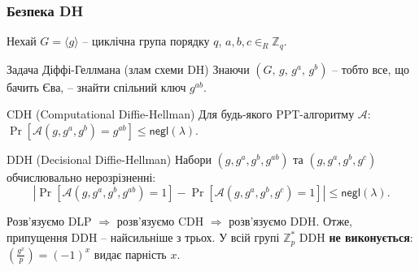 \documentclass{../zkdl-presentation-template}
\newcommand{\legendre}[2]{\left(\frac{#1}{#2}\right)}
\newcommand{\inR}{\in_R}
\begin{document}
\begin{frame}
    \frametitle{Безпека DH}
    \small
    Нехай $G=\langle g\rangle$ -- циклічна група порядку $q$, $a,b,c\inR\mathbb{Z}_q$.
    \begin{block}{Задача Діффі-Геллмана (злам схеми DH)}
        Знаючи $(G,\,g,\,g^{a},\,g^{b})$ -- тобто все, що бачить Єва, -- знайти спільний ключ $g^{ab}$.
    \end{block}
    \vspace{-2mm}
    \begin{block}{CDH (Computational Diffie-Hellman)}
        Для будь-якого PPT-алгоритму $\mathcal{A}$: \
        $\Pr\left[\mathcal{A}(g,g^{a},g^{b})=g^{ab}\right]\le\mathsf{negl}(\lambda)$.
    \end{block}
    \vspace{-2mm}
    \begin{block}{DDH (Decisional Diffie-Hellman)}
        Набори $(g,g^{a},g^{b},g^{ab})$ та $(g,g^{a},g^{b},g^{c})$ обчислювально нерозрізненні:
        \vspace{-1mm}
        \begin{equation*}
            \left|\Pr\left[\mathcal{A}(g,g^{a},g^{b},g^{ab})=1\right]-\Pr\left[\mathcal{A}(g,g^{a},g^{b},g^{c})=1\right]\right|\le\mathsf{negl}(\lambda).
        \end{equation*}
    \end{block}
    \vspace{-2mm}
    \begin{alertblock}{}
        \footnotesize
        Розв'язуємо DLP $\Rightarrow$ розв'язуємо CDH $\Rightarrow$ розв'язуємо DDH. Отже, припущення DDH -- найсильніше з трьох.
        У всій групі $\mathbb{Z}_p^*$ DDH \textbf{не виконується}: $\legendre{g^{x}}{p}=(-1)^{x}$ видає парність $x$.
    \end{alertblock}
\end{frame}
\end{document}
